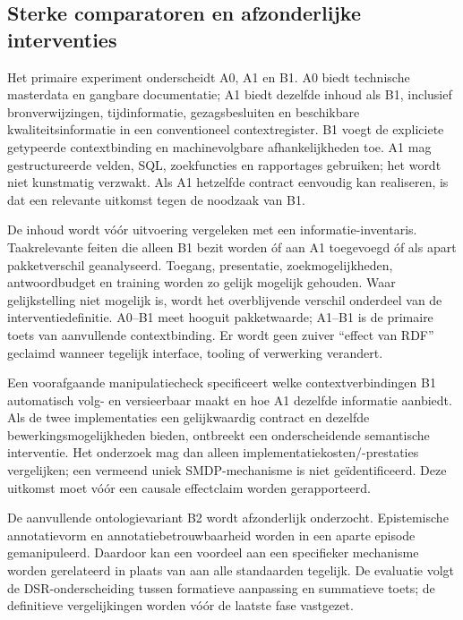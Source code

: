 \subsection{Sterke comparatoren en afzonderlijke interventies}
Het primaire experiment onderscheidt A0, A1 en B1. A0 biedt technische masterdata en gangbare documentatie; A1 biedt dezelfde inhoud als B1, inclusief bronverwijzingen, tijdinformatie, gezagsbesluiten en beschikbare kwaliteitsinformatie in een conventioneel contextregister. B1 voegt de expliciete getypeerde contextbinding en machinevolgbare afhankelijkheden toe. A1 mag gestructureerde velden, SQL, zoekfuncties en rapportages gebruiken; het wordt niet kunstmatig verzwakt. Als A1 hetzelfde contract eenvoudig kan realiseren, is dat een relevante uitkomst tegen de noodzaak van B1.

De inhoud wordt vóór uitvoering vergeleken met een informatie-inventaris. Taakrelevante feiten die alleen B1 bezit worden óf aan A1 toegevoegd óf als apart pakketverschil geanalyseerd. Toegang, presentatie, zoekmogelijkheden, antwoordbudget en training worden zo gelijk mogelijk gehouden. Waar gelijkstelling niet mogelijk is, wordt het overblijvende verschil onderdeel van de interventiedefinitie. A0--B1 meet hooguit pakketwaarde; A1--B1 is de primaire toets van aanvullende contextbinding. Er wordt geen zuiver ``effect van RDF'' geclaimd wanneer tegelijk interface, tooling of verwerking verandert.

Een voorafgaande manipulatiecheck specificeert welke contextverbindingen B1 automatisch volg- en versieerbaar maakt en hoe A1 dezelfde informatie aanbiedt. Als de twee implementaties een gelijkwaardig contract en dezelfde bewerkingsmogelijkheden bieden, ontbreekt een onderscheidende semantische interventie. Het onderzoek mag dan alleen implementatiekosten/-prestaties vergelijken; een vermeend uniek SMDP-mechanisme is niet geïdentificeerd. Deze uitkomst moet vóór een causale effectclaim worden gerapporteerd.

De aanvullende ontologievariant B2 wordt afzonderlijk onderzocht. Epistemische annotatievorm en annotatiebetrouwbaarheid worden in een aparte episode gemanipuleerd. Daardoor kan een voordeel aan een specifieker mechanisme worden gerelateerd in plaats van aan alle standaarden tegelijk. De evaluatie volgt de DSR-onderscheiding tussen formatieve aanpassing en summatieve toets; de definitieve vergelijkingen worden vóór de laatste fase vastgezet. \citep{L03}

